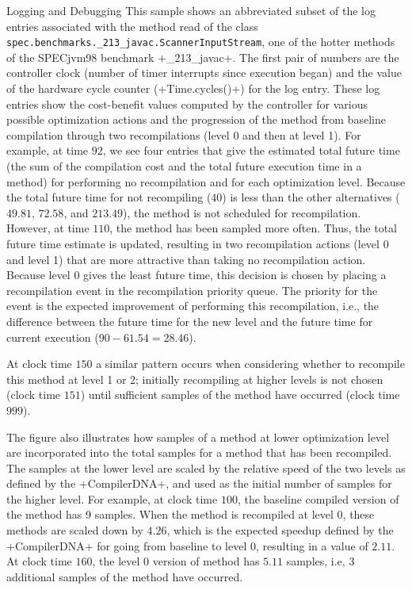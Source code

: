 \begin{section}{Logging and Debugging}
This sample shows an abbreviated subset of the log entries associated with the method read of the class \texttt{spec.bench\-marks.\_213\_javac.Scan\-ner\-In\-put\-Stream}, one of the hotter methods of the SPECjvm98 benchmark \spverb+_213_javac+. The first pair of numbers are the controller clock (number of timer interrupts since execution began) and the value of the hardware cycle counter (\spverb+Time.cycles()+) for the log entry. These log entries show the cost-benefit values computed by the controller for various possible optimization actions and the progression of the method from baseline compilation through two recompilations (level 0 and then at level 1). For example, at time $92$, we see four entries that give the estimated total future time (the sum of the compilation cost and the total future execution time in a method) for performing no recompilation and for each optimization level. Because the total future time for not recompiling ($40$) is less than the other alternatives ($49.81$, $72.58$, and $213.49$), the method is not scheduled for recompilation. However, at time $110$, the method has been sampled more often. Thus, the total future time estimate is updated, resulting in two recompilation actions (level 0 and level 1) that are more attractive than taking no recompilation action. Because level 0 gives the least future time, this decision is chosen by placing a recompilation event in the recompilation priority queue. The priority for the event is the expected improvement of performing this recompilation, i.e., the difference between the future time for the new level and the future time for current execution ($90 - 61.54 = 28.46$).

At clock time $150$ a similar pattern occurs when considering whether to recompile this method at level 1 or 2; initially recompiling at higher levels is not chosen (clock time $151$) until sufficient samples of the method have occurred (clock time $999$).

The figure also illustrates how samples of a method at lower optimization level are incorporated into the total samples for a method that has been recompiled. The samples at the lower level are scaled by the relative speed of the two levels as defined by the \spverb+CompilerDNA+, and used as the initial number of samples for the higher level. For example, at clock time $100$, the baseline compiled version of the method has 9 samples. When the method is recompiled at level 0, these methods are scaled down by $4.26$, which is the expected speedup defined by the \spverb+CompilerDNA+ for going from baseline to level 0, resulting in a value of $2.11$. At clock time $160$, the level 0 version of method has $5.11$ samples, i.e, $3$ additional samples of the method have occurred.

\end{section}

